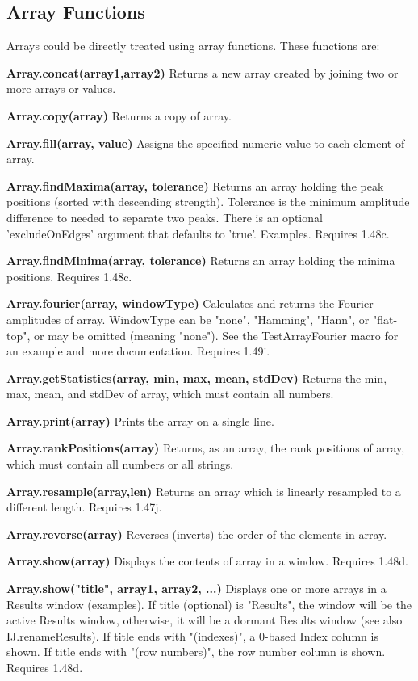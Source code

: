 \subsection{Array Functions}

Arrays could be directly treated using array functions. These functions are:
\begin{shaded}\begin{indentCom}
\item \textbf{Array.concat(array1,array2)} Returns a new array created by
joining two or more arrays or values. 
\item \textbf{Array.copy(array)} Returns a copy of array. 
\item \textbf{Array.fill(array, value)} Assigns the specified numeric value to
each element of array.
\item \textbf{Array.findMaxima(array, tolerance)} Returns an array holding the peak positions (sorted with descending strength). Tolerance is the minimum amplitude difference to needed to separate two peaks. There is an optional 'excludeOnEdges' argument that defaults to 'true'. Examples. Requires 1.48c.
\item \textbf{Array.findMinima(array, tolerance)} Returns an array holding the minima positions. Requires 1.48c.
\item \textbf{Array.fourier(array, windowType)} Calculates and returns the Fourier amplitudes of array. WindowType can be "none", "Hamming", "Hann", or "flat-top", or may be omitted (meaning "none"). See the TestArrayFourier macro for an example and more documentation. Requires 1.49i. 
\item \textbf{Array.getStatistics(array, min, max, mean, stdDev)} Returns the
min, max, mean, and stdDev of array, which must contain all numbers.
\item \textbf{Array.print(array)} Prints the array on a single line. 
\item \textbf{Array.rankPositions(array)} Returns, as an array, the rank
positions of array, which must contain all numbers or all strings. 
\item \textbf{Array.resample(array,len)} Returns an array which is linearly resampled to a different length. Requires 1.47j. 
\item \textbf{Array.reverse(array)} Reverses (inverts) the order of the
elements in array. 
\item \textbf{Array.show(array)} Displays the contents of array in a window. Requires 1.48d.
\item \textbf{Array.show("title", array1, array2, ...)} Displays one or more arrays in a Results window (examples). If title (optional) is "Results", the window will be the active Results window, otherwise, it will be a dormant Results window (see also IJ.renameResults). If title ends with "(indexes)", a 0-based Index column is shown. If title ends with "(row numbers)", the row number column is shown. Requires 1.48d. 

\end{indentCom}
\end{shaded}
